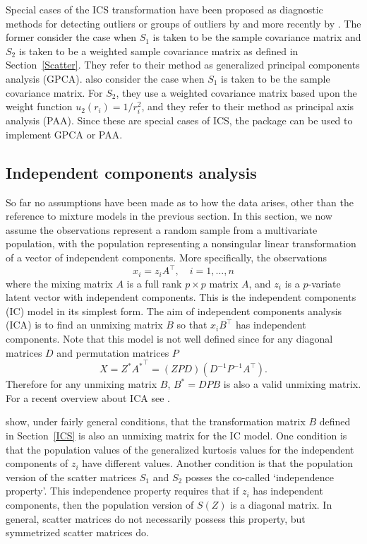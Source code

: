 \documentclass[article,nojss]{jss}
\begin{document}
Special cases of the {ICS} transformation have been proposed as diagnostic methods for detecting outliers
or groups of outliers by \citet{Ruiz-Gazen1994} and more recently by \citet{Critchley2008}. The former
consider the case when $S_1$ is taken to be the sample covariance matrix and $S_2$ is taken to be a weighted
sample covariance matrix as defined in Section~\ref{Scatter}.  They refer to their method as generalized
principal components analysis ({GPCA}). \citet{Critchley2008} also consider the case when $S_1$ is taken to be
the sample covariance matrix. For $S_2$, they use a weighted covariance matrix based upon the weight
function $u_2(r_i) = 1/r^2_i$, and they refer to their method as principal axis analysis ({PAA}). Since these
are special cases of {ICS}, the  package  can be used to implement {GPCA} or
{PAA}.

\subsection{Independent components analysis}\label{MADics}

So far no assumptions have been made as to how the data arises, other than the reference to mixture models
in the previous section.  In this section, we now assume the observations represent a random sample from
a multivariate population, with the population representing a nonsingular linear transformation of
a vector of independent components. More specifically, the observations
\[
x_i=z_iA^\top, \quad i=1,\ldots,n
\]
where the mixing matrix $A$ is a full rank $p \times p$ matrix $A$, and $z_i$ is a $p$-variate latent vector with
independent components. This is the independent components ({IC}) model in its simplest form. The aim of independent
components analysis ({ICA}) is to find an unmixing matrix $B$ so that $x_iB^\top$ has independent components. Note that this
model is not well defined since for any diagonal matrices $D$ and permutation matrices $P$
\[
X=Z^*{A^{*}}^\top =(ZPD)(D^{-1}P^{-1}A^\top).
\]
Therefore for any unmixing matrix $B$, $B^*=DPB$ is also a valid unmixing matrix. For a recent overview about
ICA see \citet{HyvarinenKarhunenOja2001}.

\citet{OjaSirkiaEriksson2006} show, under fairly general conditions, that the transformation matrix $B$ defined in
Section~\ref{ICS} is also an unmixing matrix for the {IC} model. One condition is that the population
values of the generalized kurtosis values for the independent components of $z_i$ have different values. Another
condition is that the population version of the scatter matrices $S_1$ and $S_2$ posses the co-called `independence property'.
This independence property requires that if $z_i$ has independent components, then the population version of $S(Z)$ is
a diagonal matrix. In general, scatter matrices do not necessarily possess this property, but symmetrized scatter matrices do.
\end{document}
